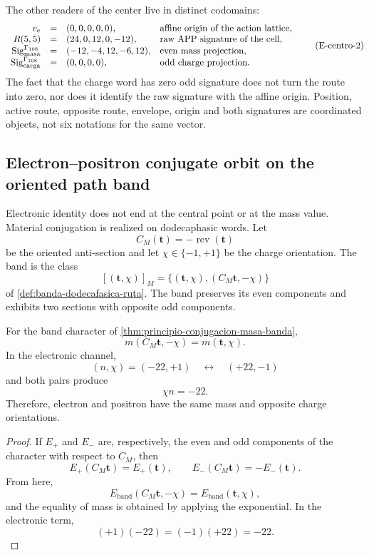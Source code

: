 The other readers of the center live in distinct codomains:
\[
\begin{array}{rcll}
 v_e&=&(0,0,0,0,0),
   &\text{affine origin of the action lattice},\\
 R(5,5)&=&(24,0,12,0,-12),
   &\text{raw APP signature of the cell},\\
 \operatorname{Sig}^{\Gamma_{108}}_{\rm masa}
   &=&(-12,-4,12,-6,12),
   &\text{even mass projection},\\
 \operatorname{Sig}^{\Gamma_{108}}_{\rm carga}
   &=&(0,0,0,0),
   &\text{odd charge projection}.
\end{array}
\tag{E-centro-2}\label{p12-83-c15-s2:eq:electron-firmas-tipadas-rev8}
\]
The fact that the charge word has zero odd signature does not turn the route into
zero, nor does it identify the raw signature with the affine origin. Position, active
route, opposite route, envelope, origin and both signatures are coordinated
objects, not six notations for the same vector.

\subsection{Electron–positron conjugate orbit on the oriented path band}

Electronic identity does not end at the central point or at the mass
value. Material conjugation is realized on dodecaphasic words. Let
\[
 C_M(\mathbf t)=-\operatorname{rev}(\mathbf t)
\]
be the oriented anti-section and let
\(\chi\in\{-1,+1\}\) be the charge orientation. The band is the class
\[
 [(\mathbf t,\chi)]_M
 =
 \{(\mathbf t,\chi),(C_M\mathbf t,-\chi)\}
\]
of \cref{def:banda-dodecafasica-ruta}. The band preserves its even
components and exhibits two sections with opposite odd components.

\begin{theorem}
\label{p12-83-c15-s2:thm:electron-positron-biografia-rev6}
For the band character of
\cref{thm:principio-conjugacion-masa-banda},
\[
 m(C_M\mathbf t,-\chi)=m(\mathbf t,\chi).
\]
In the electronic channel,
\[
 (n,\chi)=(-22,+1)
 \quad\longleftrightarrow\quad
 (+22,-1)
\]
and both pairs produce
\[
 \chi n=-22.
\]
Therefore, electron and positron have the same mass and opposite charge orientations.
\end{theorem}

\begin{proof}
If \(E_+\) and \(E_-\) are, respectively, the even and odd
components of the character with respect to \(C_M\), then
\[
 E_+(C_M\mathbf t)=E_+(\mathbf t),
 \qquad
 E_-(C_M\mathbf t)=-E_-(\mathbf t).
\]
From here,
\[
 E_{\mathrm{band}}(C_M\mathbf t,-\chi)
 =
 E_{\mathrm{band}}(\mathbf t,\chi),
\]
and the equality of mass is obtained by applying the exponential. In the electronic term,
\[
 (+1)(-22)=(-1)(+22)=-22.
\]
\end{proof}

